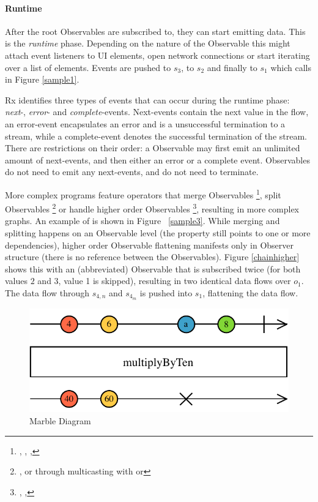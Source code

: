 \paragraph{Runtime} After the root Observables are subscribed to, they
can start emitting data.  This is the \emph{runtime} phase.  Depending
on the nature of the Observable this might attach event listeners to UI
elements, open network connections or start iterating over a list of
elements.  Events are pushed to $ s_3 $, to $ s_2 $ and finally to $ s_1
$ which calls  in Figure%
\ref{sample1}.

Rx identifies three types of events that can occur during the runtime
phase:  \emph{next}-, \emph{error}- and \emph{complete}-events.
Next-events contain the next value in the flow, an error-event
encapsulates an error and is a unsuccessful termination to a stream,
while a complete-event denotes the successful termination of the stream.
There are restrictions on their order:  a Observable may first emit an
unlimited amount of next-events, and then either an error or a complete
event.  Observables do not need to emit any next-events, and do not need
to terminate.

More complex programs feature operators that merge Observables%
\footnote{ , , , 
}, split Observables%
\footnote{ , or through multicasting with  or
 } or handle higher order Observables%
\footnote{ , ,  },
resulting in more complex graphs.  An example of  is shown
in Figure~%
\ref{sample3}.  While merging and splitting happens on an Observable
level (the  property still points to one or more
dependencies), higher order Observable flattening manifests only in
Observer structure (there is no reference between the Observables).
Figure%
\ref{chainhigher} shows this with an (abbreviated) 
Observable that is subscribed twice (for both values $ 2 $ and $ 3 $,
value 1 is skipped), resulting in two identical data flows over $ o_1 $.
The data flow through $ s_{4,n} $ and $ s_{4_m} $ is pushed into $ s_1 $,
flattening the data flow.

\begin{figure}[t]
    \centering
    \includegraphics[width=\columnwidth]{images/marble-diagram.pdf}
    \caption{Marble Diagram}%
    \label{marblediagram-image}
\end{figure}

